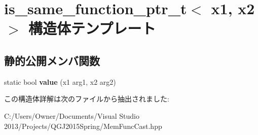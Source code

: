 \hypertarget{structis__same__function__ptr__t}{}\section{is\+\_\+same\+\_\+function\+\_\+ptr\+\_\+t$<$ x1, x2 $>$ 構造体テンプレート}
\label{structis__same__function__ptr__t}
\subsection*{静的公開メンバ関数}
\begin{DoxyCompactItemize}
\item 
static bool {\bfseries value} (x1 arg1, x2 arg2)\hypertarget{structis__same__function__ptr__t_a14d691261be9b2327f16306c41410a3d}{}\label{structis__same__function__ptr__t_a14d691261be9b2327f16306c41410a3d}

\end{DoxyCompactItemize}


この構造体詳解は次のファイルから抽出されました\+:\begin{DoxyCompactItemize}
\item 
C\+:/\+Users/\+Owner/\+Documents/\+Visual Studio 2013/\+Projects/\+Q\+G\+J2015\+Spring/Mem\+Func\+Cast.\+hpp\end{DoxyCompactItemize}
